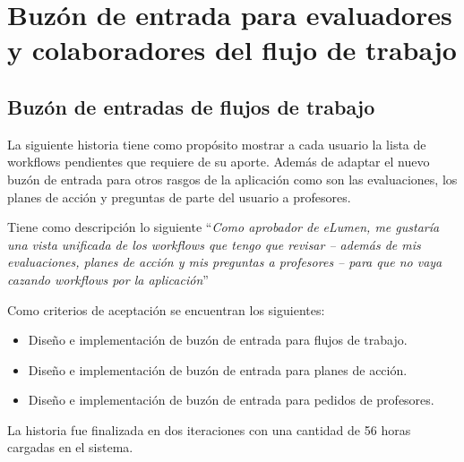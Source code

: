 \section{Buzón de entrada para evaluadores y colaboradores del flujo de trabajo}
\begin{table}[H]
\centering
\caption{Historias de usuario para el buzón de entrada para evaluadores y colaboradores del flujo de trabajo}
\label{epic:4}
\end{table}

\subsection{Buzón de entradas de flujos de trabajo}
La siguiente historia tiene como propósito mostrar a cada usuario la lista de workflows pendientes que requiere de su aporte. Además de adaptar el nuevo buzón de entrada para otros rasgos de la aplicación como son las evaluaciones, los planes de acción y preguntas de parte del usuario a profesores.

Tiene como descripción lo siguiente \enquote{\textit{Como aprobador de eLumen, me gustaría una vista unificada de los workflows que tengo que revisar – además de mis evaluaciones, planes de acción y mis preguntas a profesores – para que no vaya cazando workflows por la aplicación}}

Como criterios de aceptación se encuentran los siguientes:
\begin{itemize}
	\item Diseño e implementación de buzón de entrada para flujos de trabajo.
	\item Diseño e implementación de buzón de entrada para planes de acción.
	\item Diseño e implementación de buzón de entrada para pedidos de profesores.
\end{itemize}

La historia fue finalizada en dos iteraciones con una cantidad de 56 horas cargadas en el sistema.


